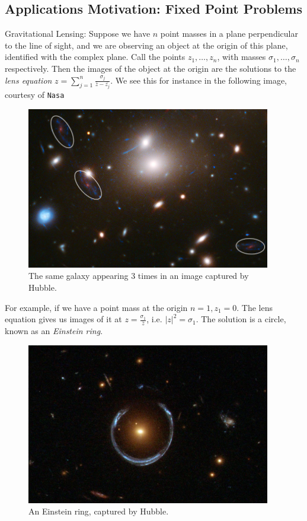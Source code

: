 \documentclass[10pt,a4paper]{article}
\begin{document}
\subsection{Applications Motivation: Fixed Point Problems}
Gravitational Lensing: Suppose we have $n$ point masses in a plane perpendicular to the line of sight, and we are observing an object at the origin of this plane, identified with the complex plane. Call the points $z_1, \ldots, z_n$, with masses $\sigma_1, \ldots, \sigma_n$ respectively. Then the images of the object at the origin are the solutions to the \emph{lens equation} $z = \sum_{j=1}^n \frac{\sigma_j}{\bar{z} - \bar{z_j}}$. We see this for instance in the following image, courtesy of \texttt{Nasa}
\begin{figure}[H]
  \centering
  \includegraphics[width=0.95\textwidth]{compdyn03.jpg}
  \caption{The same galaxy appearing 3 times in an image captured by Hubble.}
\end{figure}

For example, if we have a point mass at the origin $n=1, z_1 = 0$. The lens equation gives us images of it at $z = \frac{\sigma_1}{\bar{z}}$, i.e. $|z|^2 = \sigma_1$. The solution is a circle, known as an \emph{Einstein ring}.
\begin{figure}[H]
  \centering
  \includegraphics[width=0.95\textwidth]{compdyn04.jpg}
  \caption{An Einstein ring, captured by Hubble.}
\end{figure}
\end{document}
